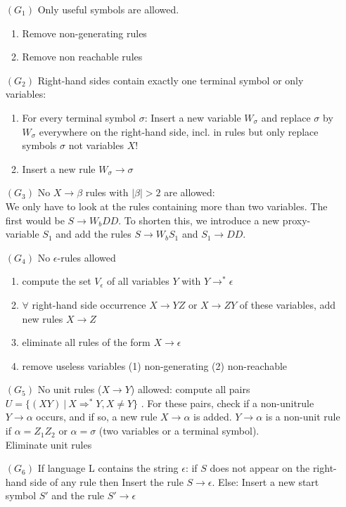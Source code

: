 \documentclass[a3paper, 8pt]{extarticle}
\begin{document}
\begin{multicols*}{6}
\begin{enumerate}
    \item[$(G_1)$] Only useful symbols are allowed.
    \begin{enumerate}
        \item Remove non-generating rules
        \item Remove non reachable rules     \end{enumerate}
    \item[$(G_2)$] Right-hand sides contain exactly one terminal symbol or only variables: \begin{enumerate}
        \item For every terminal symbol $\sigma$: Insert a new variable $W_\sigma$ and replace $\sigma$ by $W_\sigma$ everywhere on the right-hand side, incl. in rules but only replace symbols $\sigma$ not variables $X$!
        \item Insert a new rule $W_\sigma \to \sigma$
    \end{enumerate}
    \item[$(G_3)$] No $X \to \beta$ rules with $|\beta| > 2$ are allowed: \\ We only have to look at the rules containing more than two variables. The first would be $S \to W_bDD$. To shorten this, we introduce a new proxy-variable $S_1$ and add the rules $S \to W_bS_1$ and $S_1 \to DD$.
    \item[$(G_4)$] No $\epsilon$-rules allowed\begin{enumerate}
        \item compute the set $V_{\epsilon}$ of all variables $Y$ with $Y\to^* \epsilon$
        \item $\forall$ right-hand side occurrence $X \to YZ$ or $X \to ZY$ of these variables, add new rules $X \to Z$
        \item eliminate all rules of the form $X \to \epsilon$
        \item remove useless variables (1) non-generating (2) non-reachable
    \end{enumerate} 
    \item[$(G_5)$] No unit rules ($X \to Y$) allowed:
    compute all pairs $U = \{(XY) \ | \ X \Rightarrow^* Y, X \neq Y \}$ . For these pairs, check if a non-unitrule $Y \to \alpha$ occurs, and if so, a new rule $X \to \alpha$ is added. $Y \to \alpha$ is a non-unit rule if $α = Z_1Z_2$ or $\alpha = \sigma$ (two variables or a terminal symbol).\\ Eliminate unit rules\\
    \item[$(G_6)$] If language L contains the string $\epsilon$: 
if $S$ does not appear on the right-hand side of any rule then Insert the rule $S \to \epsilon$. Else: Insert a new start symbol $S′$ and the rule $S′ \to \epsilon$


\end{enumerate}
\end{multicols*}
\end{document}
